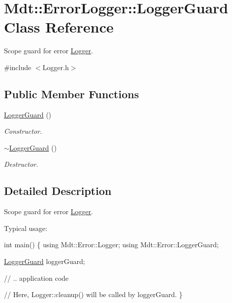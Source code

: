 \hypertarget{class_mdt_1_1_error_logger_1_1_logger_guard}{}\section{Mdt\+:\+:Error\+Logger\+:\+:Logger\+Guard Class Reference}
\label{class_mdt_1_1_error_logger_1_1_logger_guard}


Scope guard for error \hyperlink{class_mdt_1_1_error_logger_1_1_logger}{Logger}.  




{\ttfamily \#include $<$Logger.\+h$>$}

\subsection*{Public Member Functions}
\begin{DoxyCompactItemize}
\item 
\hyperlink{class_mdt_1_1_error_logger_1_1_logger_guard_a206dae2204438c86ce5fb70470b800e4}{Logger\+Guard} ()\hypertarget{class_mdt_1_1_error_logger_1_1_logger_guard_a206dae2204438c86ce5fb70470b800e4}{}\label{class_mdt_1_1_error_logger_1_1_logger_guard_a206dae2204438c86ce5fb70470b800e4}

\begin{DoxyCompactList}\small\item\em Constructor. \end{DoxyCompactList}\item 
\hyperlink{class_mdt_1_1_error_logger_1_1_logger_guard_a46942a98dcdf36a9df5857e9114e7466}{$\sim$\+Logger\+Guard} ()
\begin{DoxyCompactList}\small\item\em Destructor. \end{DoxyCompactList}\end{DoxyCompactItemize}


\subsection{Detailed Description}
Scope guard for error \hyperlink{class_mdt_1_1_error_logger_1_1_logger}{Logger}. 

Typical usage\+: 
\begin{DoxyCode}
\textcolor{keywordtype}{int} main()
\{
  \textcolor{keyword}{using} Mdt::Error::Logger;
  \textcolor{keyword}{using} Mdt::Error::LoggerGuard;

  \hyperlink{class_mdt_1_1_error_logger_1_1_logger_guard_a206dae2204438c86ce5fb70470b800e4}{LoggerGuard} loggerGuard;

  \textcolor{comment}{// .. application code}

  \textcolor{comment}{// Here, Logger::cleanup() will be called by loggerGuard.}
\}
\end{DoxyCode}



